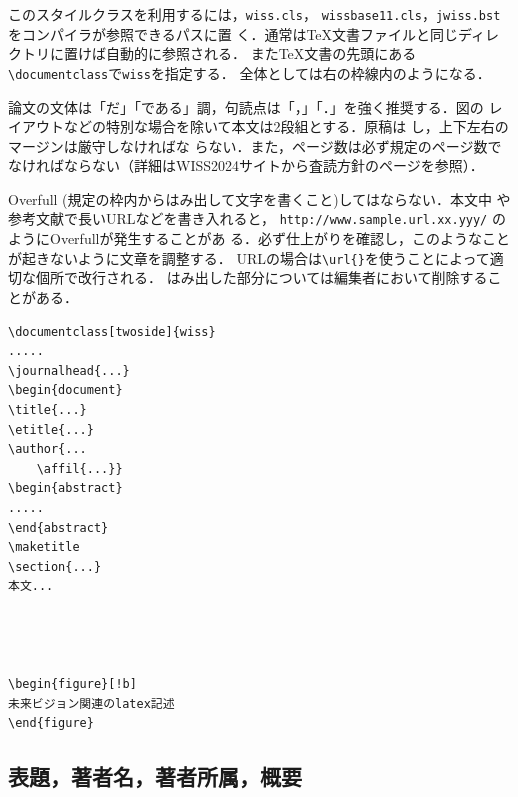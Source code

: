 \documentclass[twoside]{wiss}
\begin{document}
このスタイルクラスを利用するには，\verb|wiss.cls|，
\verb|wissbase11.cls|，\verb|jwiss.bst|をコンパイラが参照できるパスに置
く．通常は\TeX 文書ファイルと同じディレクトリに置けば自動的に参照される．
また\TeX 文書の先頭にある\verb|\documentclass|で\verb|wiss|を指定する．
全体としては右の枠線内のようになる．

論文の文体は「だ」「である」調，句読点は「，」「．」を強く推奨する．図の
レイアウトなどの特別な場合を除いて本文は2段組とする．原稿は
し，上下左右のマージンは厳守しなければな
らない．また，ページ数は必ず規定のページ数でなければならない（詳細はWISS2024サイトから査読方針のページを参照）．

Overfull (規定の枠内からはみ出して文字を書くこと)してはならない．本文中
や参考文献で長いURLなどを書き入れると，
\verb|http://www.sample.url.xx.yyy/| のようにOverfullが発生することがあ
る．必ず仕上がりを確認し，このようなことが起きないように文章を調整する．
URLの場合は\verb|\url{}|を使うことによって適切な個所で改行される．
はみ出した部分については編集者において削除することがある．

\begin{screen}
\begin{verbatim}
\documentclass[twoside]{wiss}
.....
\journalhead{...}
\begin{document}
\title{...}
\etitle{...}
\author{...
    \affil{...}}
\begin{abstract}
.....
\end{abstract}
\maketitle
\section{...}
本文...




\begin{figure}[!b]
未来ビジョン関連のlatex記述
\end{figure}
\end{verbatim}
\end{screen}



\subsection{表題，著者名，著者所属，概要}
\end{document}
